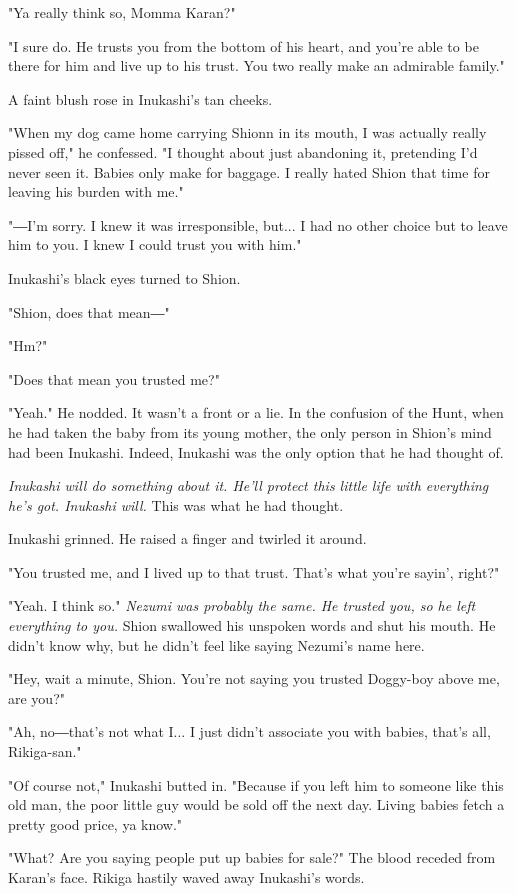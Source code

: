 "Ya really think so, Momma Karan?"

"I sure do. He trusts you from the bottom of his heart, and you're able
to be there for him and live up to his trust. You two really make an
admirable family."

A faint blush rose in Inukashi's tan cheeks.

"When my dog came home carrying Shionn in its mouth, I was actually
really pissed off," he confessed. "I thought about just abandoning it,
pretending I'd never seen it. Babies only make for baggage. I really
hated Shion that time for leaving his burden with me."

"―I'm sorry. I knew it was irresponsible, but... I had no other choice
but to leave him to you. I knew I could trust you with him."

Inukashi's black eyes turned to Shion.

"Shion, does that mean―"

"Hm?"

"Does that mean you trusted me?"

"Yeah." He nodded. It wasn't a front or a lie. In the confusion of the
Hunt, when he had taken the baby from its young mother, the only person
in Shion's mind had been Inukashi. Indeed, Inukashi was the only option
that he had thought of.

\emph{Inukashi will do something about it. He'll protect this little life with
everything he's got. Inukashi will.} This was what he had thought.

Inukashi grinned. He raised a finger and twirled it around.

"You trusted me, and I lived up to that trust. That's what you're
sayin', right?"

"Yeah. I think so." \emph{Nezumi was probably the same. He trusted you, so he
left everything to you.} Shion swallowed his unspoken words and shut his
mouth. He didn't know why, but he didn't feel like saying Nezumi's name
here.

"Hey, wait a minute, Shion. You're not saying you trusted Doggy-boy
above me, are you?"

"Ah, no―that's not what I... I just didn't associate you with babies,
that's all, Rikiga-san."

"Of course not," Inukashi butted in. "Because if you left him to someone
like this old man, the poor little guy would be sold off the next day.
Living babies fetch a pretty good price, ya know."

"What? Are you saying people put up babies for sale?" The blood receded
from Karan's face. Rikiga hastily waved away Inukashi's words.

